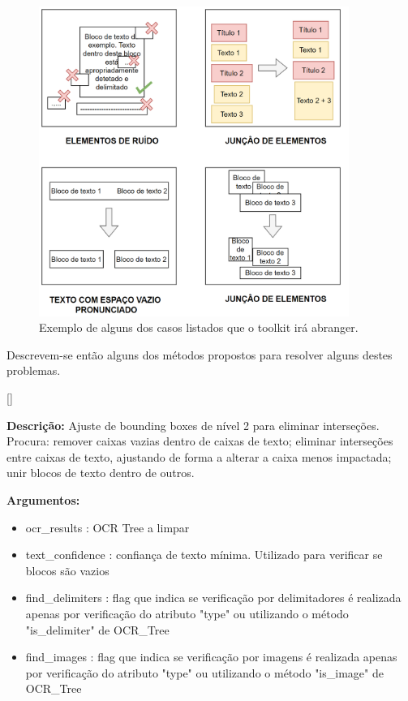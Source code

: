 \begin{figure}[H]
	\centering
	\includegraphics[width=0.9\textwidth]{images/ilustracoes/clean_ocr_cases_example.png}
	\caption{Exemplo de alguns dos casos listados que o toolkit irá abranger.}
	\label{fig:clean_ocr_cases_example}
\end{figure}


Descrevem-se então alguns dos métodos propostos para resolver alguns destes problemas.


[\normalsize]

\textbf{Descrição:} Ajuste de bounding boxes de nível 2 para eliminar interseções. Procura: remover caixas vazias dentro de caixas de texto; eliminar interseções entre caixas de texto, ajustando de forma a alterar a caixa menos impactada; unir blocos de texto dentro de outros.

\textbf{Argumentos:}
\begin{itemize}\setlength\itemsep{-0.3em}
	\item ocr\_results : OCR Tree a limpar
	\item text\_confidence : confiança de texto mínima. Utilizado para verificar se blocos são vazios
	\item find\_delimiters : flag que indica se verificação por delimitadores é realizada apenas por verificação do atributo "type" ou utilizando o método "is\_delimiter" de OCR\_Tree
	\item find\_images : flag que indica se verificação por imagens é realizada apenas por verificação do atributo "type" ou utilizando o método "is\_image" de OCR\_Tree
\end{itemize}

